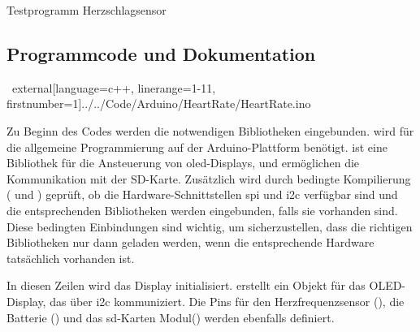 \begin{code}[h]
    \caption{Testprogramm Herzschlagsensor} 
    \label{Code:Arduino:HeartRateSensor}
\end{code}


\subsection{Programmcode und Dokumentation}

\begin{code}[h]
    \
    external[language=c++, linerange={1-11}, firstnumber=1]{../../Code/Arduino/HeartRate/HeartRate.ino}
\end{code}

Zu Beginn des Codes werden die notwendigen Bibliotheken eingebunden.  wird für die allgemeine Programmierung auf der Arduino-Plattform benötigt.  ist eine Bibliothek für die Ansteuerung von \ac{oled}-Displays,  und  ermöglichen die Kommunikation mit der SD-Karte. Zusätzlich wird durch bedingte Kompilierung ( und ) geprüft, ob die Hardware-Schnittstellen \ac{spi} und \ac{i2c} verfügbar sind und die entsprechenden Bibliotheken werden eingebunden, falls sie vorhanden sind. Diese bedingten Einbindungen sind wichtig, um sicherzustellen, dass die richtigen Bibliotheken nur dann geladen werden, wenn die entsprechende Hardware tatsächlich vorhanden ist.

\begin{code}[h]
\end{code}

In diesen Zeilen wird das Display initialisiert.  erstellt ein Objekt  für das OLED-Display, das über \ac{i2c} kommuniziert. Die Pins für den Herzfrequenzsensor (), die Batterie () und das \ac{sd}-Karten Modul() werden ebenfalls definiert.



\begin{code}[h]
\end{code}

